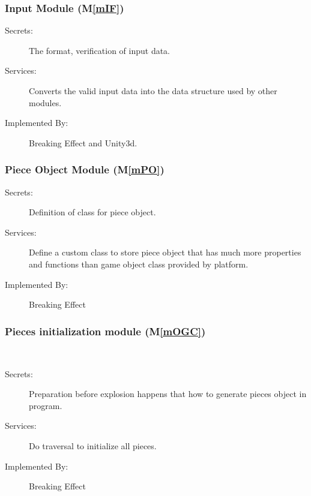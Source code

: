 \documentclass[12pt, titlepage]{article}
\newcommand{\mref}[1]{M\ref{#1}}
\begin{document}
	\subsubsection{Input Module (\mref{mIF})}
	
	\begin{description}
		\item[Secrets:]The format, verification of input data.
		\item[Services:]Converts the valid input data into the data structure used by other modules. \\
		\item[Implemented By:] Breaking Effect and Unity3d. 
	\end{description}
	
	\subsubsection{Piece Object Module (\mref{mPO})}
	
	\begin{description}
		\item[Secrets:]Definition of class for piece object.
		\item[Services:]Define a custom class to store piece object that has much more properties and functions than game object class provided by platform. \\
		\item[Implemented By:] Breaking Effect
	\end{description}
	
	\subsubsection{Pieces initialization module (\mref{mOGC})}
	\\ 
	\begin{description}
		\item[Secrets:]Preparation before explosion happens that how to generate pieces object in program.
		\item[Services:]Do traversal to initialize all pieces.
		\item[Implemented By:] Breaking Effect
	\end{description}
\end{document}
